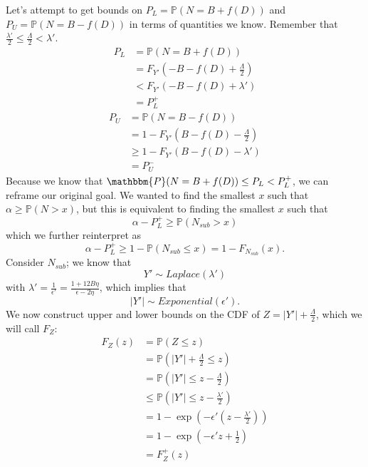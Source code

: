 \documentclass[11pt]{scrartcl} %
\begin{document}
Let's attempt to get bounds on $P_{L} = \mathbb{P}(N = B + f(D))$ and $P_{U} = \mathbb{P}(N = B - f(D))$ in terms of quantities we know. Remember that $\frac{\lambda'}{2} \leq \frac{\Lambda}{2} < \lambda'$.
\begin{align}
	P_{L} &= \mathbb{P}(N = B + f(D)) \nonumber \\
		  &= F_{Y'}(-B - f(D) + \frac{\Lambda}{2}) \nonumber \\
		  &< F_{Y'}(-B - f(D) + \lambda') \nonumber \\
		  &= P_{L}^{+} \nonumber
\end{align}
\begin{align}
	P_{U} &= \mathbb{P}(N = B - f(D)) \nonumber \\
		  &= 1 - F_{Y'}(B - f(D) - \frac{\Lambda}{2}) \nonumber \\
		  &\geq 1 - F_{Y'}(B - f(D) - \lambda') \nonumber \\
		  &= P_{U}^{-} \nonumber
\end{align}
Because we know that $\mathbbm{P}(N=B+f(D)) \leq P_L < P_{L}^{+}$, we can reframe our original goal. We wanted to find the smallest $x$ such that $\alpha \geq \mathbb{P}(N > x)$, but this is equivalent to finding the smallest $x$ such that
\[ \alpha - P_{L}^{+} \geq \mathbb{P}(N_{sub} > x) \]
which we further reinterpret as
\[ \alpha - P_{L}^{+} \geq 1 - \mathbb{P}(N_{sub} \leq x) = 1 - F_{N_{sub}}(x). \]
Consider $N_{sub}$; we know that
\[ Y' \sim Laplace (\lambda') \]
with $\lambda' = \frac{1}{\epsilon'} = \frac{1 + 12B \eta}{\epsilon - 2 \eta}$, which implies that
\[ \vert Y' \vert \sim Exponential(\epsilon'). \]
We now construct upper and lower bounds on the CDF of $Z = \vert Y' \vert + \frac{\Lambda}{2}$, which we will call $F_{Z}$:
\begin{align}
	F_{Z}(z) &= \mathbb{P}(Z \leq z) \nonumber \\
			 &= \mathbb{P}\left( \vert Y' \vert + \frac{\Lambda}{2} \leq z \right) \nonumber \\
			 &= \mathbb{P} \left( \vert Y' \vert \leq z - \frac{\Lambda}{2} \right) \nonumber \\
			 &\leq \mathbb{P} \left( \vert Y' \vert \leq z - \frac{\lambda'}{2} \right) \nonumber \\
			 &= 1 - \exp\left( -\epsilon'(z - \frac{\lambda'}{2}) \right) \nonumber \\
			 &= 1 - \exp\left( -\epsilon'z + \frac{1}{2} \right) \nonumber \\
			 &= F_{Z}^{+}(z) \nonumber
\end{align}
\end{document}
